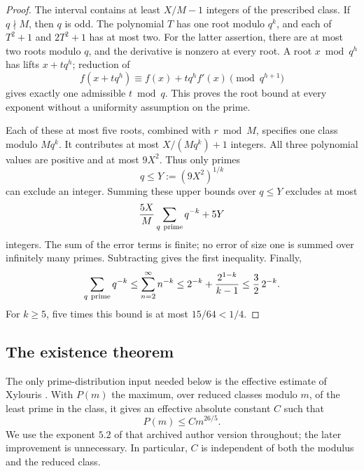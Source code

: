 \begin{proof}
The interval contains at least \(X/M-1\) integers of the prescribed
class. If \(q\nmid M\), then \(q\) is odd. The polynomial \(T\) has one
root modulo \(q^k\), and each of \(T^2+1\) and \(2T^2+1\) has at most two.
For the latter assertion, there are at most two roots modulo \(q\), and
the derivative is nonzero at every root. A root \(x\bmod q^h\) has lifts
\(x+tq^h\); reduction of
\[
 f(x+tq^h)\equiv f(x)+tq^h f'(x)\pmod {q^{h+1}}
\]
gives exactly one admissible \(t\bmod q\). This proves the root bound
at every exponent without a uniformity assumption on the prime.

Each of these at most five roots, combined with \(r\bmod M\), specifies
one class modulo \(Mq^k\). It contributes at most \(X/(Mq^k)+1\)
integers. All three polynomial values are positive and at most \(9X^2\).
Thus only primes
\[
 q\le Y:=(9X^2)^{1/k}
\]
can exclude an integer. Summing these upper bounds over \(q\le Y\)
excludes at most
\[
 \frac{5X}{M}\sum_{q\ {\rm prime}}q^{-k}+5Y
\]
integers. The sum of the error terms is finite; no error of size one
is summed over infinitely many primes. Subtracting gives the first
inequality. Finally,
\[
 \sum_{q\ {\rm prime}}q^{-k}
 \le \sum_{n=2}^{\infty}n^{-k}
 \le 2^{-k}+\frac{2^{1-k}}{k-1}
 \le \frac32\,2^{-k}.
\]
For \(k\ge5\), five times this bound is at most \(15/64<1/4\).
\end{proof}

\subsection{The existence theorem}

The only prime-distribution input needed below is the effective estimate
of Xylouris \cite[Theorem~1.1, author manuscript p.~9]{XylourisLinnik2009}.
With \(P(m)\) the maximum, over reduced classes modulo \(m\), of the least
prime in the class, it gives an effective absolute constant \(C\) such
that
\begin{equation}\label{eq:pf-linnik}
 P(m)\le C m^{26/5}.
\end{equation}
We use the exponent \(5.2\) of that archived author version throughout;
the later improvement is unnecessary. In particular, \(C\) is independent
of both the modulus and the reduced class.

